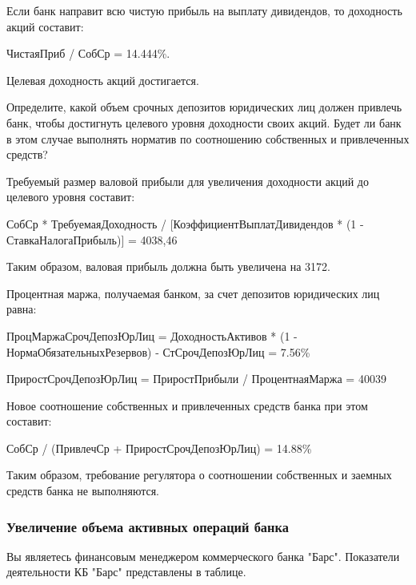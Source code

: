 \documentclass[12pt, table, a4paper,twoside]{exam}
\begin{document}
\begin{questions}
\begin{subparts}
\begin{solution}[12em]
	Если банк направит всю чистую прибыль на выплату дивидендов, то доходность акций составит:
	
	ЧистаяПриб / СобСр = 14.444\%.
	
	Целевая доходность акций достигается.
	\end{solution}
	
	\subpart[10] Определите, какой объем срочных депозитов юридических лиц должен привлечь банк, чтобы достигнуть целевого уровня доходности своих акций. Будет ли банк в этом случае выполнять норматив по соотношению собственных и привлеченных средств?
		
	\begin{solution}[12em]
	
	Требуемый размер валовой прибыли для увеличения доходности акций до целевого уровня составит:
	
	СобСр * ТребуемаяДоходность / [КоэффициентВыплатДивидендов * (1 - СтавкаНалогаПрибыль)] = 4038,46
	
	Таким образом, валовая прибыль должна быть увеличена на 3172. 
		
	Процентная маржа, получаемая банком, за счет депозитов юридических лиц равна:
	
	ПроцМаржаСрочДепозЮрЛиц = ДоходностьАктивов * (1 - НормаОбязательныхРезервов) -
	СтСрочДепозЮрЛиц = 7.56\%
	
	ПриростСрочДепозЮрЛиц =  ПриростПрибыли / ПроцентнаяМаржа = 40039
			
	Новое соотношение собственных и привлеченных средств банка при этом составит:
	
	СобСр / (ПривлечСр + ПриростСрочДепозЮрЛиц) = 14.88\%
	
	Таким образом, требование регулятора о соотношении собственных и заемных средств банка не выполняются. 		
	\end{solution}
\end{subparts}
\addpoints

\subsubsection{Увеличение объема активных операций банка}
\question[20] Вы являетесь финансовым менеджером коммерческого банка "Барс". 
Показатели деятельности КБ "Барс" представлены в таблице.


\end{questions}
\end{document}
